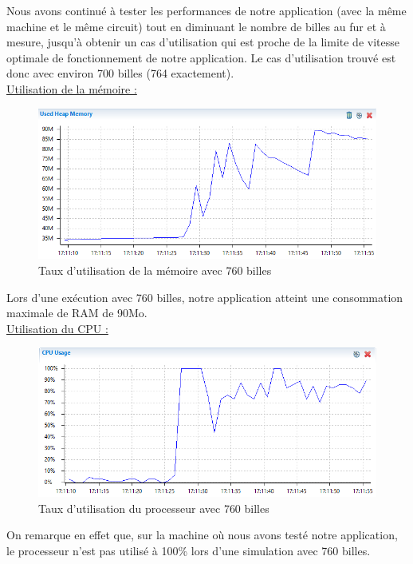 \documentclass{report}
\begin{document}
Nous avons continué à tester les performances de notre application (avec la même machine et le même circuit) tout en diminuant le nombre de billes au fur et à mesure, jusqu’à obtenir un cas d’utilisation qui est proche de la limite de vitesse optimale de fonctionnement de notre application. Le cas d’utilisation trouvé est donc avec environ 700 billes (764 exactement). \\

\underline{Utilisation de la mémoire : }

\begin{figure}[H]
\centering
\includegraphics[scale=0.8]{timeline760_memory.png}
\caption{Taux d'utilisation de la mémoire avec 760 billes}
\end{figure}

Lors d’une exécution avec 760 billes, notre application atteint une consommation maximale de RAM de 90Mo. \\

\underline{Utilisation du CPU :}

\begin{figure}[H]
\centering
\includegraphics[scale=0.9]{timeline760_cpu.png}
\caption{Taux d'utilisation du processeur avec 760 billes}
\end{figure}

On remarque en effet que, sur la machine où nous avons testé notre application, le processeur n’est pas utilisé à 100\% lors d’une simulation avec 760 billes.
\end{document}
